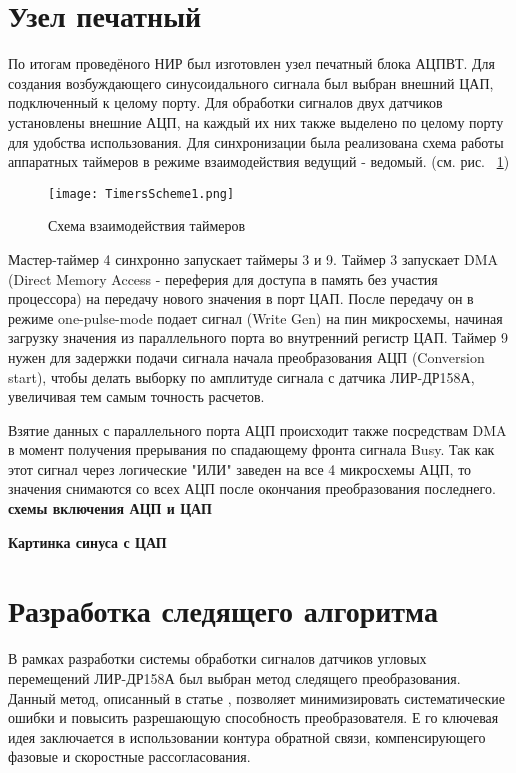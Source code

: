 \section{Узел печатный}

По итогам проведёного НИР был изготовлен узел печатный блока АЦПВТ. Для создания возбуждающего синусоидального сигнала был выбран внешний ЦАП, подключенный к целому порту. 
Для обработки сигналов двух датчиков установлены внешние АЦП, на каждый их них также выделено по целому порту для удобства использования. Для синхронизации была реализована схема 
работы аппаратных таймеров в режиме взаимодействия ведущий - ведомый. (см. рис. ~\ref{Timers})


\begin{figure}[!h]
  \centering
  \texttt{[image: TimersScheme1.png]} 
  \caption{Схема взаимодействия таймеров}
  \label{Timers}
\end{figure}

Мастер-таймер 4 синхронно запускает таймеры 3 и 9. Таймер 3 запускает DMA (Direct Memory Access - переферия для доступа в память без участия процессора) на передачу нового значения в порт ЦАП.
После передачу он в режиме one-pulse-mode подает сигнал (Write Gen) на пин микросхемы, начиная загрузку значения из параллельного порта во внутренний регистр ЦАП. Таймер 9 нужен для задержки подачи
сигнала начала преобразования АЦП (Conversion start), чтобы делать выборку по амплитуде сигнала с датчика ЛИР-ДР158А, увеличивая тем самым точность расчетов.

Взятие данных с параллельного порта АЦП происходит также посредствам DMA в момент получения прерывания по спадающему фронта сигнала Busy. Так как этот сигнал через логические "ИЛИ" 
заведен на все 4 микросхемы АЦП, то значения снимаются со всех АЦП после окончания преобразования последнего. 
\textbf{схемы включения АЦП и ЦАП}

\textbf{Картинка синуса с ЦАП}

\section{Разработка следящего алгоритма}

В рамках разработки системы обработки сигналов датчиков угловых перемещений ЛИР-ДР158А был выбран метод следящего преобразования. Данный метод, 
описанный в статье \cite{Anufriev2014}, позволяет минимизировать систематические ошибки и повысить разрешающую способность преобразователя. Е
го ключевая идея заключается в использовании контура обратной связи, компенсирующего фазовые и скоростные рассогласования.

